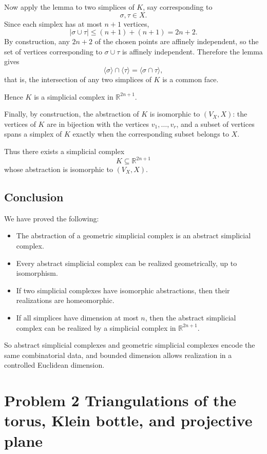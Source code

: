 \documentclass[12pt,a4paper]{article}
\theoremstyle{notespace}
\begin{document}
\medskip

Now apply the lemma to two simplices of \(K\), say corresponding to
\[
\sigma,\tau\in X.
\]
Since each simplex has at most \(n+1\) vertices,
\[
|\sigma\cup\tau|\le (n+1)+(n+1)=2n+2.
\]
By construction, any \(2n+2\) of the chosen points are affinely independent, so the set of vertices corresponding to \(\sigma\cup\tau\) is affinely independent. Therefore the lemma gives
\[
\langle \sigma\rangle \cap \langle \tau\rangle = \langle \sigma\cap\tau\rangle,
\]
that is, the intersection of any two simplices of \(K\) is a common face.

Hence \(K\) is a simplicial complex in \(\mathbb R^{2n+1}\).

Finally, by construction, the abstraction of \(K\) is isomorphic to \((V_X,X)\): the vertices of \(K\) are in bijection with the vertices \(v_1,\dots,v_r\), and a subset of vertices spans a simplex of \(K\) exactly when the corresponding subset belongs to \(X\).

Thus there exists a simplicial complex
\[
K\subseteq \mathbb R^{2n+1}
\]
whose abstraction is isomorphic to \((V_X,X)\).

\subsection{Conclusion}

We have proved the following:

\begin{itemize}
	\item The abstraction of a geometric simplicial complex is an abstract simplicial complex.
	\item Every abstract simplicial complex can be realized geometrically, up to isomorphism.
	\item If two simplicial complexes have isomorphic abstractions, then their realizations are homeomorphic.
	\item If all simplices have dimension at most \(n\), then the abstract simplicial complex can be realized by a simplicial complex in \(\mathbb R^{2n+1}\).
\end{itemize}

So abstract simplicial complexes and geometric simplicial complexes encode the same combinatorial data, and bounded dimension allows realization in a controlled Euclidean dimension.

\section{Problem 2 Triangulations of the torus, Klein bottle, and projective plane}
\end{document}
